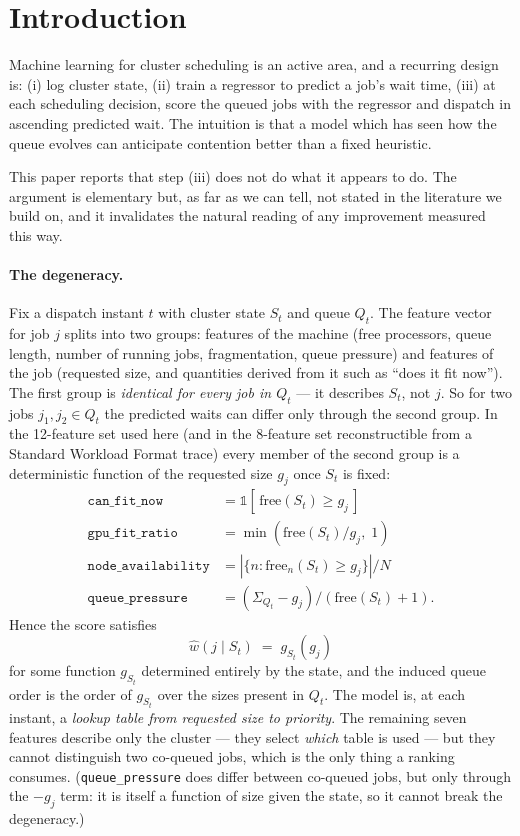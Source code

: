 \documentclass[11pt,twocolumn]{article}
\begin{document}
\section{Introduction}

Machine learning for cluster scheduling is an active area, and a recurring
design is: (i) log cluster state, (ii) train a regressor to predict a job's wait
time, (iii) at each scheduling decision, score the queued jobs with the
regressor and dispatch in ascending predicted wait. The intuition is that a
model which has seen how the queue evolves can anticipate contention better than
a fixed heuristic.

This paper reports that step (iii) does not do what it appears to do. The
argument is elementary but, as far as we can tell, not stated in the literature
we build on, and it invalidates the natural reading of any improvement measured
this way.

\paragraph{The degeneracy.}
Fix a dispatch instant $t$ with cluster state $S_t$ and queue $Q_t$. The feature
vector for job $j$ splits into two groups: features of the machine (free
processors, queue length, number of running jobs, fragmentation, queue pressure)
and features of the job (requested size, and quantities derived from it such as
``does it fit now''). The first group is \emph{identical for every job in
$Q_t$} --- it describes $S_t$, not $j$. So for two jobs $j_1, j_2 \in Q_t$ the
predicted waits can differ only through the second group. In the 12-feature set
used here (and in the 8-feature set reconstructible from a Standard Workload
Format trace) every member of the second group is a deterministic function of the
requested size $g_j$ once $S_t$ is fixed:
\begin{align*}
\texttt{can\_fit\_now} &= \mathbb{1}[\,\text{free}(S_t) \ge g_j\,] \\
\texttt{gpu\_fit\_ratio} &= \min(\text{free}(S_t)/g_j,\; 1) \\
\texttt{node\_availability} &= |\{n : \text{free}_n(S_t) \ge g_j\}| / N \\
\texttt{queue\_pressure} &= (\Sigma_{Q_t} - g_j)/(\text{free}(S_t)+1).
\end{align*}
Hence the score satisfies
\[
  \widehat{w}(j \mid S_t) \;=\; g_{S_t}(g_j)
\]
for some function $g_{S_t}$ determined entirely by the state, and the induced
queue order is the order of $g_{S_t}$ over the sizes present in $Q_t$. The model
is, at each instant, a \emph{lookup table from requested size to priority}. The
remaining seven features describe only the cluster --- they select \emph{which}
table is used --- but they cannot distinguish two co-queued jobs, which is the
only thing a ranking consumes. (\texttt{queue\_pressure} does differ between
co-queued jobs, but only through the $-g_j$ term: it is itself a function of
size given the state, so it cannot break the degeneracy.)
\end{document}
